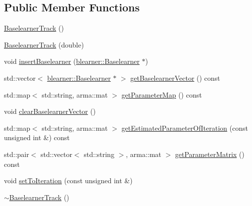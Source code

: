 \subsection*{Public Member Functions}
\begin{DoxyCompactItemize}
\item 
\mbox{\hyperlink{classblearnertrack_1_1_baselearner_track_ad90a0f286fab221aa2f2ed6401861187}{Baselearner\+Track}} ()
\item 
\mbox{\hyperlink{classblearnertrack_1_1_baselearner_track_aaba614b8351a3e5401d3f924059efc65}{Baselearner\+Track}} (double)
\item 
void \mbox{\hyperlink{classblearnertrack_1_1_baselearner_track_abc5f42093449e665b5b0dfeee8570953}{insert\+Baselearner}} (\mbox{\hyperlink{classblearner_1_1_baselearner}{blearner\+::\+Baselearner}} $\ast$)
\item 
std\+::vector$<$ \mbox{\hyperlink{classblearner_1_1_baselearner}{blearner\+::\+Baselearner}} $\ast$ $>$ \mbox{\hyperlink{classblearnertrack_1_1_baselearner_track_a596429982bd5fb1c8ffabc5f93849235}{get\+Baselearner\+Vector}} () const
\item 
std\+::map$<$ std\+::string, arma\+::mat $>$ \mbox{\hyperlink{classblearnertrack_1_1_baselearner_track_a0ba8e3943b998b58375b892f40f12c73}{get\+Parameter\+Map}} () const
\item 
void \mbox{\hyperlink{classblearnertrack_1_1_baselearner_track_aa178f9d817a01240b6f39075f1f445f2}{clear\+Baselearner\+Vector}} ()
\item 
std\+::map$<$ std\+::string, arma\+::mat $>$ \mbox{\hyperlink{classblearnertrack_1_1_baselearner_track_a9b0678ef3573206959be2068d115c556}{get\+Estimated\+Parameter\+Of\+Iteration}} (const unsigned int \&) const
\item 
std\+::pair$<$ std\+::vector$<$ std\+::string $>$, arma\+::mat $>$ \mbox{\hyperlink{classblearnertrack_1_1_baselearner_track_a4b6d2d8b585148c71ed5b6055c9ab08c}{get\+Parameter\+Matrix}} () const
\item 
void \mbox{\hyperlink{classblearnertrack_1_1_baselearner_track_a06f0ac986a158eecddce64e6c7af0750}{set\+To\+Iteration}} (const unsigned int \&)
\item 
\mbox{\hyperlink{classblearnertrack_1_1_baselearner_track_a93e9a1268d46808b9d6fe768fa11e22a}{$\sim$\+Baselearner\+Track}} ()
\end{DoxyCompactItemize}
